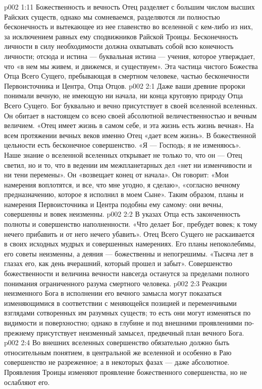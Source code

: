 \vs p002 1:11 Божественность и вечность Отец разделяет с большим числом высших Райских существ, однако мы сомневаемся, разделяются ли полностью бесконечность и вытекающее из нее главенство во вселенной с кем\hyp{}либо из них, за исключением равных ему сподвижников Райской Троицы. Бесконечность личности в силу необходимости должна охватывать собой всю конечность личности; отсюда и истина --- буквальная истина --- учения, которое утверждает, что «в нем мы живем, и движемся, и существуем». Эта частица чистого Божества Отца Всего Сущего, пребывающая в смертном человеке,  частью бесконечности Первоисточника и Центра, Отца Отцов.
\vs p002 2:1 Даже ваши древние пророки понимали вечную, не имеющую ни начала, ни конца круговую природу Отца Всего Сущего. Бог буквально и вечно присутствует в своей вселенной вселенных. Он обитает в настоящем со всею своей абсолютной величественностью и вечным величием. «Отец имеет жизнь в самом себе, и эта жизнь есть жизнь вечная». На всем протяжении вечных веков именно Отец «дает всем жизнь». В божественной цельности есть бесконечное совершенство. «Я --- Господь; я не изменяюсь». Наше знание о вселенной вселенных открывает не только то, что он --- Отец светил, но и то, что в ведении им межпланетарных дел «нет ни изменчивости и ни тени перемены». Он «возвещает конец от начала». Он говорит: «Мои намерения воплотятся, и все, что мне угодно, я сделаю», «согласно вечному предназначению, которое я исполнил в моем Сыне». Таким образом, планы и намерения Первоисточника и Центра подобны ему самому: они вечны, совершенны и вовек неизменны.
\vs p002 2:2 В указах Отца есть законченность полноты и совершенство наполненности. «Что делает Бог, пребудет вовек; к тому нечего прибавить и от него нечего убавить». Отец Всего Сущего не раскаивается в своих исходных мудрых и совершенных намерениях. Его планы непоколебимы, его советы неизменны, а деяния --- божественны и непогрешимы. «Тысяча лет в глазах его, как день вчерашний, который прошел и забыт». Совершенство божественности и величина вечности навсегда останутся за пределами полного понимания ограниченного разума смертного человека.
\vs p002 2:3 \pc Реакции неизменного Бога в исполнении его вечного замысла могут показаться изменяющимися в соответствии с меняющейся позицией и переменчивыми взглядами сотворенных им разумных существ; то есть они могут изменяться по видимости и поверхностно; однако в глубине и под внешними проявлениями по\hyp{}прежнему присутствует неизменный замысел, предвечный план вечного Бога.
\vs p002 2:4 Во внешних вселенных совершенство обязательно должно быть относительным понятием, в центральной же вселенной и особенно в Раю совершенство не разреженное; а в некоторых фазах --- даже абсолютное. Проявления Троицы изменяют проявление божественного совершенства, но не ослабляют его.
